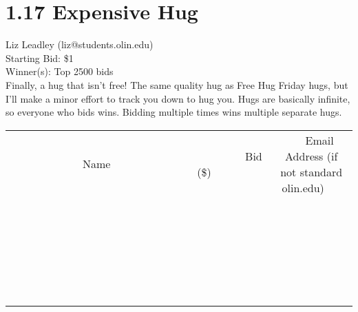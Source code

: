 \documentclass[11pt]{article}
\begin{document}
\section*{1.17 Expensive Hug}
Liz Leadley (liz@students.olin.edu) \\
Starting Bid: \$1 \\
Winner(s): 
Top 2500 bids \\
Finally, a hug that isn't free! The same quality hug as Free Hug Friday hugs, but I'll make a minor effort to track you down to hug you.
Hugs are basically infinite, so everyone who bids wins. Bidding multiple times wins multiple separate hugs. \\[6ex]
\begin{tabular}{c c c}
~~~~~~~~~~~~~Name~~~~~~~~~~~~~ & ~~~~~~~~~Bid (\$)~~~~~~~~~ & ~~~Email Address (if not standard olin.edu)~~~ \\
 & & \\
\hline
 & & \\
\hline
 & & \\
\hline
 & & \\
\hline
 & & \\
\hline
 & & \\
\hline
 & & \\
\hline
 & & \\
\hline
 & & \\
\hline
 & & \\
\hline
 & & \\
\hline
 & & \\
\hline
 & & \\
\hline
 & & \\
\hline
 & & \\
\hline
 & & \\
\hline
 & & \\
\hline
 & & \\
\hline
 & & \\
\hline
 & & \\
\hline
 & & \\
\hline
 & & \\
\hline
 & & \\
\hline
 & & \\
\hline
 & & \\
\hline
 & & \\
\hline
\end{tabular}
\clearpage
\end{document}
